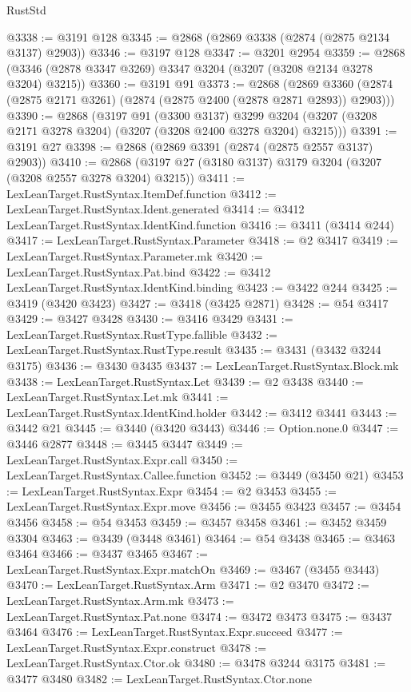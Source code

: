 \begin{lexlean}{RustStd}
\begin{coremodule}
{{{{{{{{{{{{{{{{{{{@3338 := @3191 @128
@3345 := @2868 (@2869 @3338 (@2874 (@2875 @2134 @3137) @2903))
@3346 := @3197 @128
@3347 := @3201 @2954
@3359 := @2868 (@3346 (@2878 @3347 @3269) @3347 @3204 (@3207 (@3208 @2134 @3278 @3204) @3215))
@3360 := @3191 @91
@3373 := @2868
    (@2869 @3360 (@2874 (@2875 @2171 @3261) (@2874 (@2875 @2400 (@2878 @2871 @2893)) @2903)))
@3390 := @2868
    (@3197
      @91
      (@3300 @3137)
      @3299
      @3204
      (@3207 (@3208 @2171 @3278 @3204) (@3207 (@3208 @2400 @3278 @3204) @3215)))
@3391 := @3191 @27
@3398 := @2868 (@2869 @3391 (@2874 (@2875 @2557 @3137) @2903))
@3410 := @2868 (@3197 @27 (@3180 @3137) @3179 @3204 (@3207 (@3208 @2557 @3278 @3204) @3215))
@3411 := LexLeanTarget.RustSyntax.ItemDef.function
@3412 := LexLeanTarget.RustSyntax.Ident.generated
@3414 := @3412 LexLeanTarget.RustSyntax.IdentKind.function
@3416 := @3411 (@3414 @244)
@3417 := LexLeanTarget.RustSyntax.Parameter
@3418 := @2 @3417
@3419 := LexLeanTarget.RustSyntax.Parameter.mk
@3420 := LexLeanTarget.RustSyntax.Pat.bind
@3422 := @3412 LexLeanTarget.RustSyntax.IdentKind.binding
@3423 := @3422 @244
@3425 := @3419 (@3420 @3423)
@3427 := @3418 (@3425 @2871)
@3428 := @54 @3417
@3429 := @3427 @3428
@3430 := @3416 @3429
@3431 := LexLeanTarget.RustSyntax.RustType.fallible
@3432 := LexLeanTarget.RustSyntax.RustType.result
@3435 := @3431 (@3432 @3244 @3175)
@3436 := @3430 @3435
@3437 := LexLeanTarget.RustSyntax.Block.mk
@3438 := LexLeanTarget.RustSyntax.Let
@3439 := @2 @3438
@3440 := LexLeanTarget.RustSyntax.Let.mk
@3441 := LexLeanTarget.RustSyntax.IdentKind.holder
@3442 := @3412 @3441
@3443 := @3442 @21
@3445 := @3440 (@3420 @3443)
@3446 := Option.none.{0}
@3447 := @3446 @2877
@3448 := @3445 @3447
@3449 := LexLeanTarget.RustSyntax.Expr.call
@3450 := LexLeanTarget.RustSyntax.Callee.function
@3452 := @3449 (@3450 @21)
@3453 := LexLeanTarget.RustSyntax.Expr
@3454 := @2 @3453
@3455 := LexLeanTarget.RustSyntax.Expr.move
@3456 := @3455 @3423
@3457 := @3454 @3456
@3458 := @54 @3453
@3459 := @3457 @3458
@3461 := @3452 @3459 @3304
@3463 := @3439 (@3448 @3461)
@3464 := @54 @3438
@3465 := @3463 @3464
@3466 := @3437 @3465
@3467 := LexLeanTarget.RustSyntax.Expr.matchOn
@3469 := @3467 (@3455 @3443)
@3470 := LexLeanTarget.RustSyntax.Arm
@3471 := @2 @3470
@3472 := LexLeanTarget.RustSyntax.Arm.mk
@3473 := LexLeanTarget.RustSyntax.Pat.none
@3474 := @3472 @3473
@3475 := @3437 @3464
@3476 := LexLeanTarget.RustSyntax.Expr.succeed
@3477 := LexLeanTarget.RustSyntax.Expr.construct
@3478 := LexLeanTarget.RustSyntax.Ctor.ok
@3480 := @3478 @3244 @3175
@3481 := @3477 @3480
@3482 := LexLeanTarget.RustSyntax.Ctor.none
}}}}}}}}}}}}}}}}}}}
\end{coremodule}
\end{lexlean}
